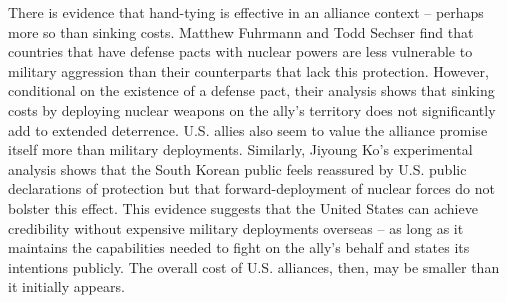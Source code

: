 

There is evidence that hand-tying is effective in an alliance context -- perhaps more so than sinking costs. Matthew Fuhrmann and Todd Sechser find that countries that have defense pacts with nuclear powers are less vulnerable to military aggression than their counterparts that lack this protection.\autocite{FuhrmannSechser2014} However, conditional on the existence of a defense pact, their analysis shows that sinking costs by deploying nuclear weapons on the ally's territory does not significantly add to extended deterrence. U.S. allies also seem to value the alliance promise itself more than military deployments. Similarly, Jiyoung Ko's experimental analysis shows that the South Korean public feels reassured by U.S. public declarations of protection but that forward-deployment of nuclear forces do not bolster this effect.\autocite{koFPA18} This evidence suggests that the United States can achieve credibility without expensive military deployments overseas -- as long as it maintains the capabilities needed to fight on the ally's behalf and states its intentions publicly. The overall cost of U.S. alliances, then, may be smaller than it initially appears.


